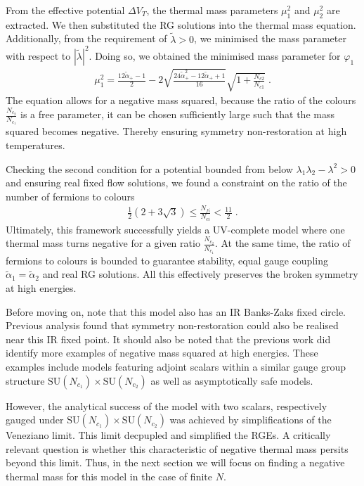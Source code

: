 From the effective potential $\Delta V_T$, the thermal mass parameters $\mu_1^2$ and $\mu_2^2$ are extracted. We then substituted the RG solutions into the thermal mass equation. Additionally, from the requirement of $\tilde\lambda>0$, we minimised the mass parameter with respect to $|\tilde\lambda|^2$. Doing so, we obtained the minimised mass parameter for $\varphi_1$
\begin{align}
    \mu_1^2=\frac{12\tilde\alpha_+-1}{2}-2\sqrt{\frac{24\tilde\alpha_+^2-12\tilde\alpha_++1}{16}}
\sqrt{1+\frac{N_{c2}}{N_{c1}}}\;.
\end{align}
The equation allows for a negative mass squared, because the ratio of the colours $\frac{N_{c_2}}{N_{c_1}}$ is a free parameter, it can be chosen sufficiently large such that the mass squared becomes negative. Thereby ensuring symmetry non-restoration at high temperatures. 

Checking the second condition for a potential bounded from below $\lambda_1\lambda_2-\lambda^2>0$ and ensuring real fixed flow solutions, we found a constraint on the ratio of the number of fermions to colours
\begin{align}
    \frac{1}{2}\left(2+3\sqrt{3}\right)\leq\frac{N_{fi}}{N_{ci}}<\frac{11}{2}\;.
\end{align}
Ultimately, this framework successfully yields a UV-complete model where one thermal mass turns negative for a given ratio $\frac{N_{c_2}}{N_{c_1}}$. At the same time, the ratio of fermions to colours is bounded to guarantee stability, equal gauge coupling $\tilde\alpha_1=\tilde \alpha_2$ and real RG solutions. All this effectively preserves the broken symmetry at high energies. 

Before moving on, note that this model also has an IR Banks-Zaks fixed circle. Previous analysis found that symmetry non-restoration could also be realised near this IR fixed point. It should also be noted that the previous work did identify more examples of negative mass squared at high energies. These examples include models featuring adjoint scalars within a similar gauge group structure $\mathrm{SU}(N_{c_1})\times\mathrm{SU}(N_{c_2})$ as well as asymptotically safe models. 

However, the analytical success of the model with two scalars, respectively gauged under $\mathrm{SU}(N_{c_1})\times\mathrm{SU}(N_{c_2})$ was achieved by simplifications of the Veneziano limit. This limit decpupled and simplified the RGEs. A critically relevant question is whether this characteristic of negative thermal mass persits beyond this limit. Thus, in the next section we will focus on finding a negative thermal mass for this model in the case of finite $N$. 

